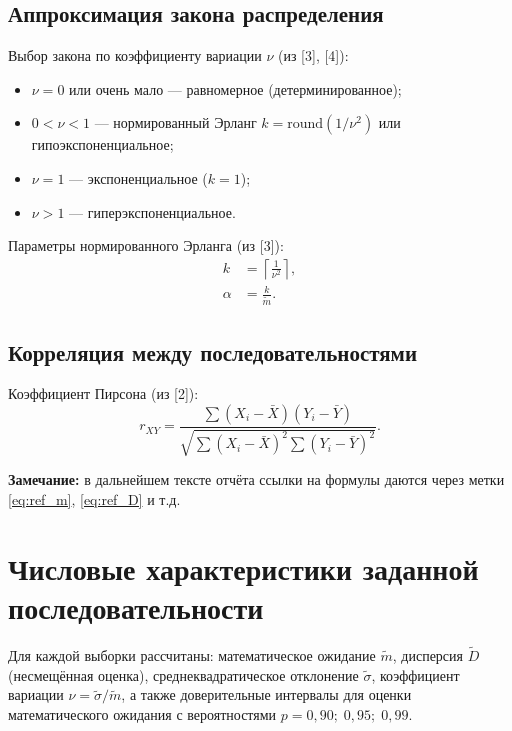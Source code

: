 \documentclass[a4paper,12pt]{article}
\begin{document}
\subsection{Аппроксимация закона распределения}
Выбор закона по коэффициенту вариации $\nu$ (из [3], [4]):
\begin{itemize}
    \item $\nu = 0$ или очень мало — равномерное (детерминированное);
    \item $0 < \nu < 1$ — нормированный Эрланг $k = \text{round}(1/\nu^2)$ или гипоэкспоненциальное;
    \item $\nu = 1$ — экспоненциальное ($k=1$);
    \item $\nu > 1$ — гиперэкспоненциальное.
\end{itemize}
Параметры нормированного Эрланга (из [3]):
\begin{align}\label{eq:ref_erl_k}
k &= \left\lceil \frac{1}{\nu^2} \right\rceil, \\
\alpha &= \frac{k}{\tilde{m}}.
\end{align}

\subsection{Корреляция между последовательностями}
Коэффициент Пирсона (из [2]):
\begin{equation}\label{eq:ref_corr}
r_{XY} = \frac{\sum (X_i - \bar{X})(Y_i - \bar{Y})}{\sqrt{\sum (X_i - \bar{X})^2 \sum (Y_i - \bar{Y})^2}}.
\end{equation}

\textbf{Замечание:} в дальнейшем тексте отчёта ссылки на формулы даются через метки \ref{eq:ref_m}, \ref{eq:ref_D} и т.д.


\section{Числовые характеристики заданной последовательности}

Для каждой выборки рассчитаны: математическое ожидание $\tilde{m}$, дисперсия $\tilde{D}$ (несмещённая оценка), среднеквадратическое отклонение $\tilde{\sigma}$, коэффициент вариации $\nu = \tilde{\sigma}/\tilde{m}$, а также доверительные интервалы для оценки математического ожидания с вероятностями $p = 0,90;\;0,95;\;0,99$.
\end{document}
